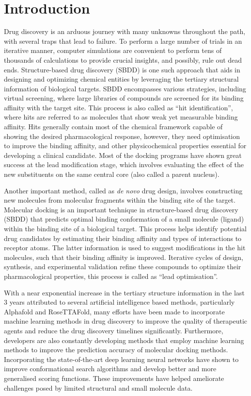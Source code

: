 \chapter*{Introduction}
Drug discovery\cite{bib32} is an arduous journey with many unknowns throughout the path, with several traps that lead to failure. To perform a large number of trials in an iterative manner, computer simulations\cite{bib33, bib34} are convenient to perform tens of thousands of calculations to provide crucial insights, and possibly, rule out dead ends. 
Structure-based drug discovery (SBDD) is one such approach that aids in designing and optimizing chemical entities by leveraging the tertiary structural information of biological targets. SBDD encompasses various strategies, including virtual screening, where large libraries of compounds are screened for its binding affinity with the target site. This process is also called as “hit identification”, where hits are referred to as molecules that show weak yet measurable binding affinity. Hits generally contain most of the chemical framework capable of showing the desired pharmacological response, however, they need optimisation to improve the binding affinity, and other physicochemical properties essential for developing a clinical candidate. Most of the docking programs have shown great success at the lead modification stage, which involves evaluating the effect of the new substituents on the same central core (also called a parent nucleus)\cite{bib53}.

Another important method, called as \textit{de novo} drug design, involves constructing new molecules from molecular fragments within the binding site of the target.  Molecular docking\cite{bib35} is an important technique in structure-based drug discovery (SBDD) that predicts optimal binding conformation of a small molecule (ligand) within the binding site of a biological target. This process helps identify potential drug candidates by estimating their binding affinity and types of interactions to receptor atoms. The latter information is used to suggest modifications in the hit molecules, such that their binding affinity is improved. Iterative cycles of design, synthesis, and experimental validation refine these compounds to optimize their pharmacological properties, this process is called as “lead optimisation”. 

With a near exponential increase in the tertiary structure information in the last 3 years attributed to several artificial intelligence based methods, particularly Alphafold\cite{bib37} and RoseTTAFold\cite{bib38}, many efforts have been made to incorporate machine learning methods in drug discovery to improve the quality of therapeutic agents and reduce the drug discovery timelines significantly\cite{bib36}. Furthermore, developers are also constantly developing methods that employ machine learning methods to improve the prediction accuracy of molecular docking methods. Incorporating the state-of-the-art deep learning neural networks have shown to improve conformational search algorithms and develop better and more generalised scoring functions. These improvements have helped ameliorate challenges posed by limited structural and small molecule data\cite{bib39, bib40}. 


